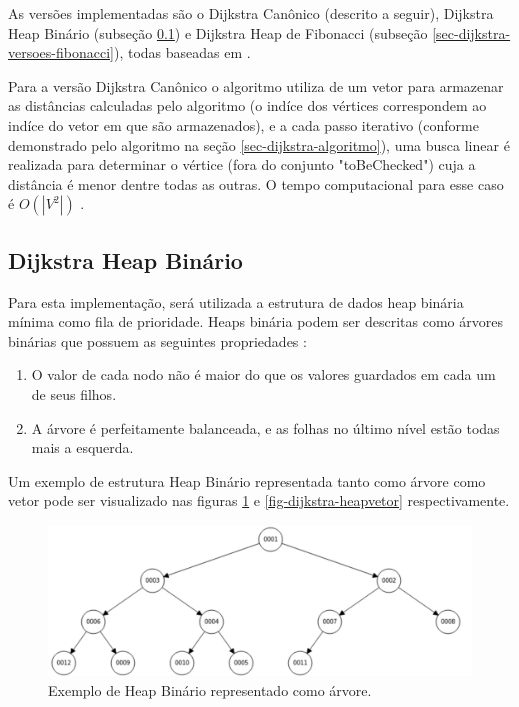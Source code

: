 As versões implementadas são o Dijkstra Canônico (descrito a seguir), Dijkstra Heap Binário (subseção \ref{sec-dijkstra-versoes-heap}) e Dijkstra Heap de Fibonacci (subseção \ref{sec-dijkstra-versoes-fibonacci}), todas baseadas em .

Para a versão Dijkstra Canônico o algoritmo utiliza de um vetor para armazenar as distâncias calculadas pelo algoritmo (o indíce dos vértices correspondem ao indíce do vetor em que são armazenados), e a cada passo iterativo (conforme demonstrado pelo algoritmo na seção \ref{sec-dijkstra-algoritmo}), uma busca linear é realizada para determinar o vértice (fora do conjunto "toBeChecked") cuja a distância é menor dentre todas as outras. O tempo computacional para esse caso é $O(|V^{2}|)$ \cite{drozdek2012data}.

\subsection{Dijkstra Heap Binário}
\label{sec-dijkstra-versoes-heap}
Para esta implementação, será utilizada a estrutura de dados heap binária mínima como fila de prioridade. Heaps binária podem ser descritas como árvores binárias que possuem as seguintes propriedades \cite{drozdek2012data}:
\begin{enumerate}
 \item O valor de cada nodo não é maior do que os valores guardados em cada um de seus filhos.
 \item A árvore é perfeitamente balanceada, e as folhas no último nível estão todas mais a esquerda.
\end{enumerate}

Um exemplo de estrutura Heap Binário representada tanto como árvore como vetor pode ser visualizado nas figuras \ref{fig-dijkstra-heapbinario} e \ref{fig-dijkstra-heapvetor} respectivamente.

\begin{figure}[H]
\centering
\includegraphics[width=.95\textwidth]{figuras/Heap} 
\caption{Exemplo de Heap Binário representado como árvore.}
\label{fig-dijkstra-heapbinario}
\end{figure}

